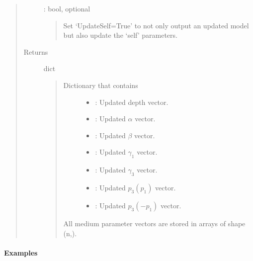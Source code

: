 \documentclass[letterpaper,10pt,english]{sphinxmanual}
\begin{document}
\begin{fulllineitems}
\begin{fulllineitems}
\begin{quote}
\begin{description}
 : bool, optional
\begin{quote}

Set ‘UpdateSelf=True’ to not only output an updated model but also update the ‘self’ parameters.
\end{quote}

\item[{Returns}] \leavevmode
dict
\begin{quote}
\begin{description}
\item[{Dictionary that contains }] \leavevmode\begin{itemize}
\item {} 
: Updated depth vector.

\item {} 
: Updated \(\alpha\) vector.

\item {} 
: Updated \(\beta\) vector.

\item {} 
: Updated \(\gamma_1\) vector.

\item {} 
: Updated \(\gamma_3\) vector.

\item {} 
: Updated \(p_3(p_1)\) vector.

\item {} 
: Updated \(p_3(-p_1)\) vector.

\end{itemize}

\end{description}

All medium parameter vectors are stored in arrays of shape (n,).
\end{quote}

\end{description}\end{quote}
\paragraph{Examples}

%
\begin{sphinxVerbatim}[commandchars=\\\{\}]
     
   
\end{sphinxVerbatim}


\end{fulllineitems}
\end{fulllineitems}
\end{document}
